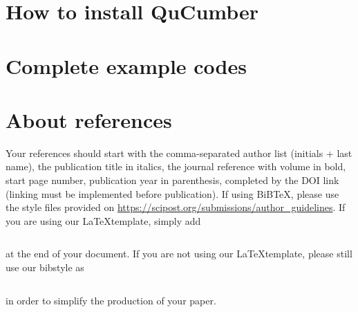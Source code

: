 \documentclass[submission, Phys]{SciPost}
\begin{document}
\begin{appendix}

\section{How to install QuCumber}

\section{Complete example codes}

\section{About references}
Your references should start with the comma-separated author list (initials + last name), the publication title in italics, the journal reference with volume in bold, start page number, publication year in parenthesis, completed by the DOI link (linking must be implemented before publication). If using BiBTeX, please use the style files provided  on \url{https://scipost.org/submissions/author_guidelines}. If you are using our \LaTeX template, simply add
\begin{verbatim}

\end{verbatim}
at the end of your document. If you are not using our \LaTeX template, please still use our bibstyle as
\begin{verbatim}

\end{verbatim}
in order to simplify the production of your paper.
\end{appendix}






\nolinenumbers
\end{document}
